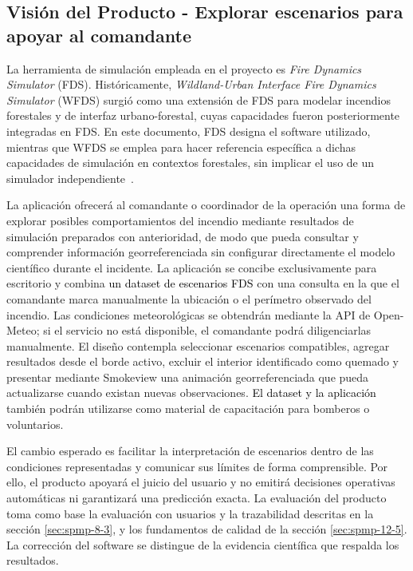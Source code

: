 \subsection{Visión del Producto - Explorar escenarios para apoyar al comandante}\label{sec:spmp-6-1}
La herramienta de simulación empleada en el proyecto es \textit{Fire Dynamics Simulator} (FDS). Históricamente, \textit{Wildland-Urban Interface Fire Dynamics Simulator} (WFDS) surgió como una extensión de FDS para modelar incendios forestales y de interfaz urbano-forestal, cuyas capacidades fueron posteriormente integradas en FDS. En este documento, FDS designa el software utilizado, mientras que WFDS se emplea para hacer referencia específica a dichas capacidades de simulación en contextos forestales, sin implicar el uso de un simulador independiente~\cite{fdsnist,wfdsusfs}.

La aplicación ofrecerá al comandante o coordinador de la operación una forma de explorar posibles comportamientos del incendio mediante resultados de simulación preparados con anterioridad, de modo que pueda consultar y comprender información georreferenciada sin configurar directamente el modelo científico durante el incidente. La aplicación se concibe exclusivamente para escritorio y combina \textcolor{black}{un dataset de escenarios FDS} con una consulta en la que el comandante marca manualmente la ubicación o el perímetro observado del incendio. Las condiciones meteorológicas se obtendrán mediante la API de Open-Meteo; si el servicio no está disponible, el comandante podrá diligenciarlas manualmente. El diseño contempla seleccionar escenarios compatibles, agregar resultados desde el borde activo, excluir el interior identificado como quemado y presentar mediante Smokeview una animación georreferenciada que pueda actualizarse cuando existan nuevas observaciones. \textcolor{black}{El dataset y la aplicación} también podrán utilizarse como material de capacitación para bomberos o voluntarios.

El cambio esperado es facilitar la interpretación de escenarios dentro de las condiciones representadas y comunicar sus límites de forma comprensible. Por ello, el producto apoyará el juicio del usuario y no emitirá decisiones operativas automáticas ni garantizará una predicción exacta. La evaluación del producto toma como base la evaluación con usuarios y la trazabilidad descritas en la sección \ref{sec:spmp-8-3}, y los fundamentos de calidad de la sección \ref{sec:spmp-12-5}. La corrección del software se distingue de la evidencia científica que respalda los resultados.
